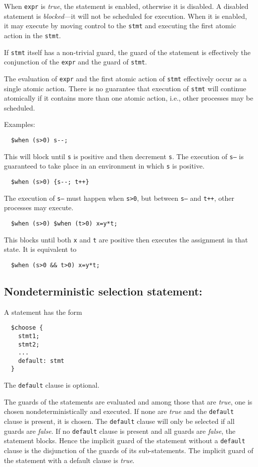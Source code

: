 When \texttt{expr} is \emph{true}, the statement is enabled, otherwise
it is disabled.  A disabled statement is \emph{blocked}---it will not
be scheduled for execution.  When it is enabled, it may execute by
moving control to the \texttt{stmt} and executing the first atomic
action in the \texttt{stmt}.

If \texttt{stmt} itself has a non-trivial guard, the guard of the
\cwhen{} statement is effectively the conjunction of the \texttt{expr}
and the guard of \texttt{stmt}.

The evaluation of \texttt{expr} and the first atomic action of
\texttt{stmt} effectively occur as a single atomic action.  There is
no guarantee that execution of \texttt{stmt} will continue atomically
if it contains more than one atomic action, i.e., other processes may
be scheduled.

Examples:
\begin{verbatim}
  $when (s>0) s--;
\end{verbatim}
This will block until \texttt{s} is positive and then decrement
\texttt{s}.  The execution of \texttt{s--} is guaranteed to take place
in an environment in which \texttt{s} is positive.

\begin{verbatim}
  $when (s>0) {s--; t++}
\end{verbatim}
The execution of \texttt{s--} must happen when \texttt{s>0}, but
between \texttt{s--} and \texttt{t++}, other processes may execute.

\begin{verbatim}
  $when (s>0) $when (t>0) x=y*t;
\end{verbatim}
This blocks until both \texttt{x} and \texttt{t} are positive then
executes the assignment in that state.  It is equivalent to
\begin{verbatim}
  $when (s>0 && t>0) x=y*t;
\end{verbatim}

\subsection{Nondeterministic selection statement: \cchoose}

A \cchoose{} statement has the form
\begin{verbatim}
  $choose {
    stmt1;
    stmt2;
    ...
    default: stmt
  }
\end{verbatim}
The \texttt{default} clause is optional.

The guards of the statements are evaluated and among those that are
\emph{true}, one is chosen nondeterministically and executed.  If none
are \emph{true} and the \texttt{default} clause is present, it is
chosen.  The \texttt{default} clause will only be selected if all
guards are \emph{false}.  If no \texttt{default} clause is present and
all guards are \emph{false}, the statement blocks.  Hence the implicit
guard of the \cchoose{} statement without a \texttt{default} clause is
the disjunction of the guards of its sub-statements.  The implicit
guard of the \cchoose{} statement with a default clause is
\emph{true}.

